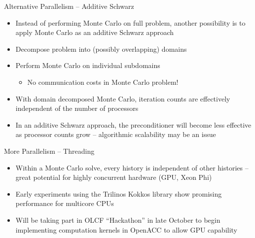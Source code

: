 \documentclass{beamer}
\begin{document}
\begin{frame}{Alternative Parallelism -- Additive Schwarz}
  \begin{itemize}
    \item Instead of performing Monte Carlo on full problem, another
      possibility is to apply Monte Carlo as an additive Schwarz approach
    \vfill
    \item Decompose problem into (possibly overlapping) domains
    \vfill
    \item Perform Monte Carlo on individual subdomains
      \begin{itemize}
        \item No communication costs in Monte Carlo problem!
      \end{itemize}
    \vfill
    \item With domain decomposed Monte Carlo, iteration counts are effectively
      independent of the number of processors
    \vfill
    \item In an additive Schwarz approach, the preconditioner will become
      less effective as processor counts grow -- algorithmic scalability
      may be an issue
  \end{itemize}
\end{frame}
\begin{frame}{More Parallelism -- Threading}
  \begin{itemize}
    \item Within a Monte Carlo solve, every history is independent of other
      histories -- great potential for highly concurrent hardware
      (GPU, Xeon Phi)
    \vfill
    \item Early experiments using the Trilinos Kokkos library show promising
      performance for multicore CPUs
    \vfill
    \item Will be taking part in OLCF ``Hackathon'' in late October to begin
      implementing computation kernels in OpenACC to allow GPU capability
  \end{itemize}
\end{frame}
\end{document}
